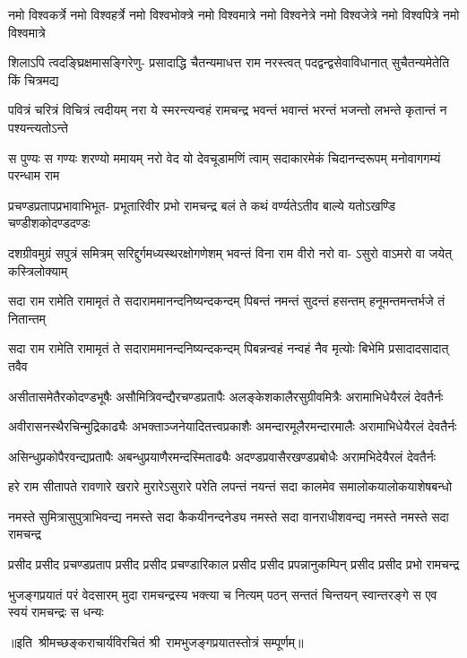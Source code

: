 \fourlineindentedshloka
{नमो विश्वकर्त्रे नमो विश्वहर्त्रे}
{नमो विश्वभोक्त्रे नमो विश्वमात्रे}
{नमो विश्वनेत्रे नमो विश्वजेत्रे}
{नमो विश्वपित्रे नमो विश्वमात्रे}%

\fourlineindentedshloka
{शिलाऽपि त्वदङ्घ्रिक्षमासङ्गिरेणु-}
{प्रसादाद्धि चैतन्यमाधत्त राम}
{नरस्त्वत् पदद्वन्द्वसेवाविधानात्}
{सुचैतन्यमेतेति किं चित्रमद्य}%

\fourlineindentedshloka
{पवित्रं चरित्रं विचित्रं त्वदीयम्}
{नरा ये स्मरन्त्यन्वहं रामचन्द्र}
{भवन्तं भवान्तं भरन्तं भजन्तो}
{लभन्ते कृतान्तं न पश्यन्त्यतोऽन्ते}%

\fourlineindentedshloka
{स पुण्यः स गण्यः शरण्यो ममायम्}
{नरो वेद यो देवचूडामणिं त्वाम्}
{सदाकारमेकं चिदानन्दरूपम्}
{मनोवागगम्यं परन्धाम राम}%

\fourlineindentedshloka
{प्रचण्डप्रतापप्रभावाभिभूत-}
{प्रभूतारिवीर प्रभो रामचन्द्र}
{बलं ते कथं वर्ण्यतेऽतीव बाल्ये}
{यतोऽखण्डि चण्डीशकोदण्डदण्डः}%

\fourlineindentedshloka
{दशग्रीवमुग्रं सपुत्रं समित्रम्}
{सरिद्दुर्गमध्यस्थरक्षोगणेशम्}
{भवन्तं विना राम वीरो नरो वा-}
{ऽसुरो वाऽमरो वा जयेत् कस्त्रिलोक्याम्}%

\fourlineindentedshloka
{सदा राम रामेति रामामृतं ते}
{सदाराममानन्दनिष्यन्दकन्दम्}
{पिबन्तं नमन्तं सुदन्तं हसन्तम्}
{हनूमन्तमन्तर्भजे तं नितान्तम्}%

\fourlineindentedshloka
{सदा राम रामेति रामामृतं ते}
{सदाराममानन्दनिष्यन्दकन्दम्}
{पिबन्नन्वहं नन्वहं नैव मृत्योः}
{बिभेमि प्रसादादसादात् तवैव}%

\fourlineindentedshloka
{असीतासमेतैरकोदण्डभूषैः}
{असौमित्रिवन्द्यैरचण्डप्रतापैः}
{अलङ्केशकालैरसुग्रीवमित्रैः}
{अरामाभिधेयैरलं देवतैर्नः}%

\fourlineindentedshloka
{अवीरासनस्थैरचिन्मुद्रिकाढ्यैः}
{अभक्ताञ्जनेयादितत्त्वप्रकाशैः}
{अमन्दारमूलैरमन्दारमालैः}
{अरामाभिधेयैरलं देवतैर्नः}%

\fourlineindentedshloka
{असिन्धुप्रकोपैरवन्द्यप्रतापैः}
{अबन्धुप्रयाणैरमन्दस्मिताढ्यैः}
{अदण्डप्रवासैरखण्डप्रबोधैः}
{अरामभिदेयैरलं देवतैर्नः}%

\fourlineindentedshloka
{हरे राम सीतापते रावणारे}
{खरारे मुरारेऽसुरारे परेति}
{लपन्तं नयन्तं सदा कालमेव}
{समालोकयालोकयाशेषबन्धो}%

\fourlineindentedshloka
{नमस्ते सुमित्रासुपुत्राभिवन्द्य}
{नमस्ते सदा कैकयीनन्दनेड्य}
{नमस्ते सदा वानराधीशवन्द्य}
{नमस्ते नमस्ते सदा रामचन्द्र}%

\fourlineindentedshloka
{प्रसीद प्रसीद प्रचण्डप्रताप}
{प्रसीद प्रसीद प्रचण्डारिकाल}
{प्रसीद प्रसीद प्रपन्नानुकम्पिन्‌}
{प्रसीद प्रसीद प्रभो रामचन्द्र}%

\fourlineindentedshloka
{भुजङ्गप्रयातं परं वेदसारम्}
{मुदा रामचन्द्रस्य भक्त्या च नित्यम्}
{पठन्‌ सन्ततं चिन्तयन्‌ स्वान्तरङ्गे}
{स एव स्वयं रामचन्द्रः स धन्यः}%

{॥इति~श्रीमच्छङ्कराचार्यविरचितं श्री~रामभुजङ्गप्रयातस्तोत्रं  सम्पूर्णम्॥}
\closesection
